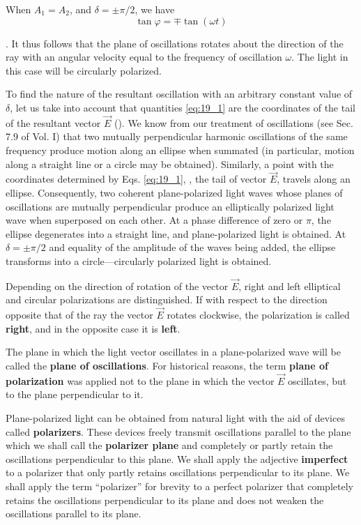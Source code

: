 When $A_1=A_2$, and $\delta=\pm\pi/2$, we have
\begin{equation*}
	\tan\varphi = \mp \tan(\omega t)
\end{equation*}

\noindent
[$\cos(\omega t\pm\pi/2) = \mp \sin(\omega t)$].
It thus follows that the plane of oscillations rotates about the direction of the ray with an angular velocity equal to the frequency of oscillation $\omega$.
The light in this case will be circularly polarized.

To find the nature of the resultant oscillation with an arbitrary constant value of $\delta$, let us take into account that quantities \eqref{eq:19_1} are the coordinates of the tail of the resultant vector $\vec{E}$ ().
We know from our treatment of oscillations (see Sec. 7.9 of Vol. I) that two mutually perpendicular harmonic oscillations of the same frequency produce motion along an ellipse when summated (in particular, motion along a straight line or a circle may be obtained).
Similarly, a point with the coordinates determined by Eqs. \eqref{eq:19_1}, \ie, the tail of vector $\vec{E}$, travels along an ellipse.
Consequently, two coherent plane-polarized light waves whose planes of oscillations are mutually
perpendicular produce an elliptically polarized light wave when superposed on each other.
At a phase difference of zero or $\pi$, the ellipse degenerates into a straight line, and plane-polarized light is obtained.
At $\delta=\pm\pi/2$ and equality of the amplitude of the waves being added, the ellipse transforms into a circle---circularly polarized light is
obtained.

Depending on the direction of rotation of the vector $\vec{E}$, right and left elliptical and circular polarizations are distinguished.
If with respect to the direction opposite that of the ray the vector $\vec{E}$ rotates clockwise, the polarization is called \textbf{right}, and in the opposite case it is \textbf{left}.

The plane in which the light vector oscillates in a plane-polarized wave will be called the \textbf{plane of oscillations}.
For historical reasons, the term \textbf{plane of polarization} was applied not to the plane in which the vector $\vec{E}$ oscillates, but to the plane perpendicular to it.

Plane-polarized light can be obtained from natural light with the aid of devices called \textbf{polarizers}.
These devices freely transmit oscillations parallel to the plane which we shall call the \textbf{polarizer plane} and completely or partly retain the oscillations perpendicular to this plane.
We shall apply the adjective \textbf{imperfect} to a polarizer that only partly retains oscillations perpendicular to its plane.
We shall apply the term ``polarizer'' for brevity to a perfect polarizer that completely retains the oscillations perpendicular to its plane and does not weaken the oscillations parallel to its plane.

